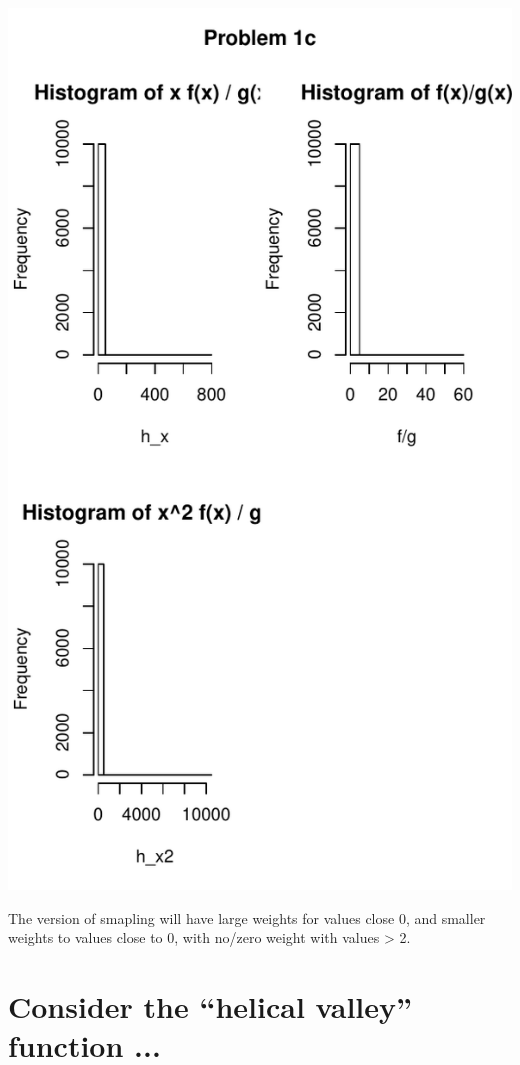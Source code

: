 \documentclass{article}\usepackage[]{graphicx}\usepackage[]{color}
\makeatletter
\def\maxwidth{ %
  \ifdim\Gin@nat@width>\linewidth
    \linewidth
  \else
    \Gin@nat@width
  \fi
}
\newenvironment{knitrout}{}{} %
\makeatother
\begin{document}
\begin{knitrout}
\includegraphics[width=\maxwidth]{figure/unnamed-chunk-3-1} 

\end{knitrout}
The version of smapling will have large weights for values close 0, and smaller weights to values close to 0, with no/zero weight with values > 2.

\section{Consider the “helical valley” function ...}
\end{document}
